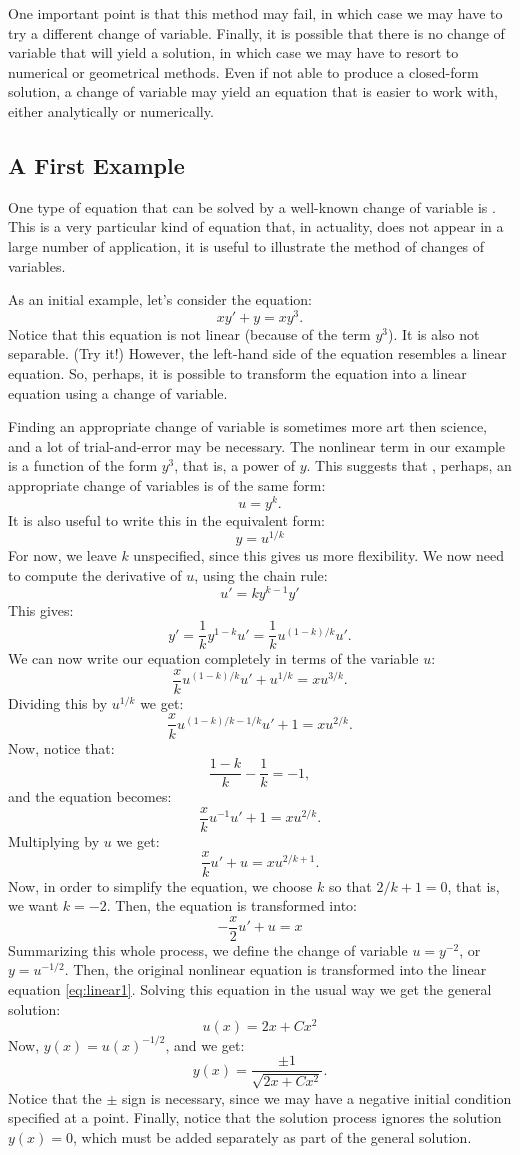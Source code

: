 \documentclass{ximera}
\begin{document}
One important point is that this method may fail, in which case we may have to try a different change of variable. Finally, it is possible that there is no change of variable that will yield a solution, in which case we may have to resort to numerical or geometrical methods. Even if not able to produce a closed-form solution, a change of variable may yield an equation that is easier to work with, either analytically or numerically.

\subsection*{A First Example}
One type of equation that can be solved by a well-known change of variable is . This is a very particular kind of equation that, in actuality, does not appear in a large number of application, it is useful to illustrate the method of changes of variables.

As an initial example, let's consider the equation:
\[
xy'+y=xy^3.
\]
Notice that this equation is not linear (because of the term $y^3$). It is also not separable. (Try it!) However, the left-hand side of the equation resembles a linear equation. So, perhaps, it is possible to transform the equation into a linear equation using a change of variable.

Finding an appropriate change of variable is sometimes more art then science, and a lot of trial-and-error may be necessary. The nonlinear term in our example is a function of the form $y^3$, that is, a power of $y$. This suggests that , perhaps, an appropriate change of variables is of the same form:
\[
u=y^k.
\]
It is also useful to write this in the equivalent form:
\[
y=u^{1/k}
\]
For now, we leave $k$ unspecified, since this gives us more flexibility. We now need to compute the derivative of $u$, using the chain rule:
\[
u'=ky^{k-1}y'
\]
This gives:
\[
y'=\frac{1}{k}y^{1-k}u'=\frac{1}{k}u^{(1-k)/k}u'.
\]
We can now write our equation completely in terms of the variable $u$:
\[
\frac{x}{k}u^{(1-k)/k}u'+u^{1/k}=xu^{3/k}.
\]
Dividing this by $u^{1/k}$ we get:
\[
\frac{x}{k}u^{(1-k)/k-1/k}u'+1=xu^{2/k}.
\]
Now, notice that:
\[
\frac{1-k}{k}-\frac{1}{k}=-1,
\]
and the equation becomes:
\[
\frac{x}{k}u^{-1}u'+1=xu^{2/k}.
\]
Multiplying by $u$ we get:
\[
\frac{x}{k}u'+u=xu^{2/k+1}.
\]
Now, in order to simplify the equation, we choose $k$ so that $2/k+1=0$, that is, we want $k=-2$. Then, the equation is transformed into:
\begin{equation}\label{eq:linear1}
-\frac{x}{2}u'+u=x
\end{equation}
Summarizing this whole process, we define the change of variable $u=y^{-2}$, or $y=u^{-1/2}$. Then, the original nonlinear equation is transformed into the linear equation \eqref{eq:linear1}. Solving this equation in the usual way we get the general solution:
\[
u(x)=2x+Cx^2
\]
Now, $y(x)=u(x)^{-1/2}$, and we get:
\[
y(x)=\frac{\pm 1}{\sqrt{2x+Cx^2}}.
\]
Notice that the $\pm$ sign is necessary, since we may have a negative initial condition specified at a point. Finally, notice that the solution process ignores the solution $y(x)=0$, which must be added separately as part of the general solution.
\end{document}

